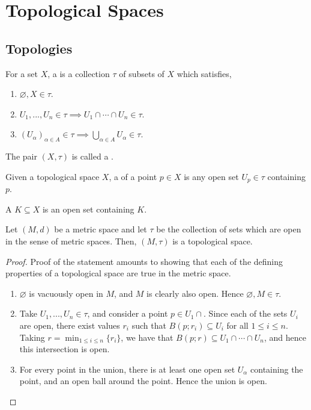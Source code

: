 \chapter{Topological Spaces}
\section{Topologies}
\begin{definition}[Topology]
	For a set $ X $, a  is a collection $ \tau $ of subsets of $ X $ which satisfies,
	\begin{enumerate}
		\item $ \varnothing, X \in \tau $.
		\item $ U_{1},...,U_{n}\in \tau \implies U_{1}\cap \cdots \cap U_{n} \in \tau $.
		\item $ ( U_{\alpha} )_{\alpha \in A} \in \tau \implies \bigcup_{\alpha \in A}^{}{U_{\alpha}} \in \tau $.
	\end{enumerate}
	The pair $ ( X, \tau ) $ is called a .
\end{definition}

\begin{definition}[Neighbourhood]
	Given a topological space $ X $, a  of a point $ p \in X $ is any open set $ U_{p} \in \tau $ containing $ p $.

	A  $ K \subseteq X $ is an open set containing $ K $.
\end{definition}

\begin{proposition}
	Let $ ( M, d ) $ be a metric space and let $ \tau $ be the collection of sets which are open in the sense of metric spaces. Then, $ ( M, \tau ) $ is a topological space.
	\begin{proof}
		Proof of the statement amounts to showing that each of the defining properties of a topological space are true in the metric space.

		\begin{enumerate}
			\item $ \varnothing $ is vacuously open in $ M $, and $ M $ is clearly also open. Hence $ \varnothing, M \in \tau $.
			\item Take $ U_{1}, ..., U_{n} \in \tau $, and consider a point $ p \in U_{1} \cap $. Since each of the sets $ U_{i} $ are open, there exist values $ r_{i} $ such that $ B ( p; r_{i} ) \subseteq U_{i} $ for all $ 1 \leq i \leq n $. Taking $ r = \min_{1 \leq i \leq n}\{ r_{i} \} $, we have that $ B ( p; r )\subseteq U_{1}\cap \cdots \cap U_{n} $, and hence this intersection is open.
			\item For every point in the union, there is at least one open set $ U_{\alpha} $ containing the point, and an open ball around the point. Hence the union is open.
		\end{enumerate}
	\end{proof}
\end{proposition}

